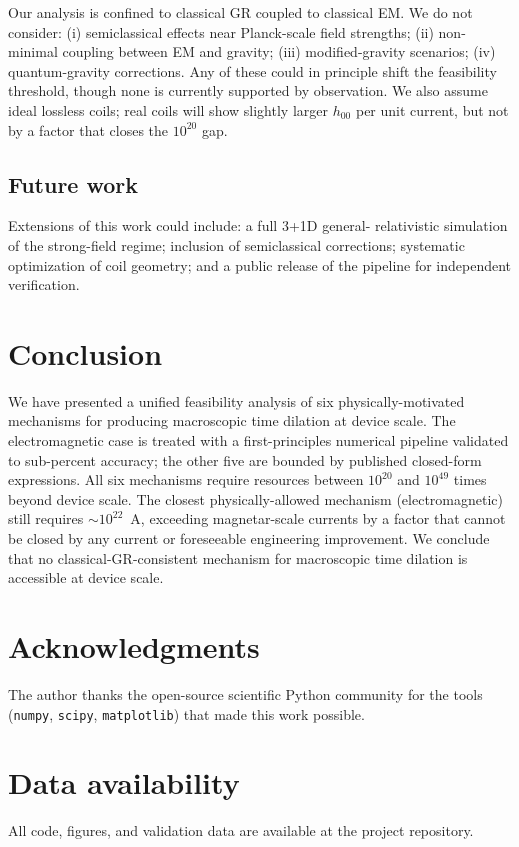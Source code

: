\documentclass[11pt,a4paper,twocolumn]{article}
\begin{document}
Our analysis is confined to classical GR coupled to classical EM.
We do not consider: (i) semiclassical effects near Planck-scale
field strengths; (ii) non-minimal coupling between EM and gravity;
(iii) modified-gravity scenarios; (iv) quantum-gravity corrections.
Any of these could in principle shift the feasibility threshold,
though none is currently supported by observation. We also assume
ideal lossless coils; real coils will show slightly larger $h_{00}$
per unit current, but not by a factor that closes the $10^{20}$ gap.

\subsection{Future work}
\label{subsec:future}

Extensions of this work could include: a full 3+1D general-
relativistic simulation of the strong-field regime; inclusion of
semiclassical corrections; systematic optimization of coil
geometry; and a public release of the pipeline for independent
verification.

\section{Conclusion}
\label{sec:conclusion}

We have presented a unified feasibility analysis of six
physically-motivated mechanisms for producing macroscopic time
dilation at device scale. The electromagnetic case is treated
with a first-principles numerical pipeline validated to
sub-percent accuracy; the other five are bounded by published
closed-form expressions. All six mechanisms require resources
between $10^{20}$ and $10^{49}$ times beyond device scale.
The closest physically-allowed mechanism (electromagnetic) still
requires $\sim 10^{22}$~A, exceeding magnetar-scale currents by
a factor that cannot be closed by any current or foreseeable
engineering improvement. We conclude that no
classical-GR-consistent mechanism for macroscopic time dilation
is accessible at device scale.

\section*{Acknowledgments}
The author thanks the open-source scientific Python community for
the tools (\texttt{numpy}, \texttt{scipy}, \texttt{matplotlib})
that made this work possible.

\section*{Data availability}
All code, figures, and validation data are available at the
project repository.
\end{document}

